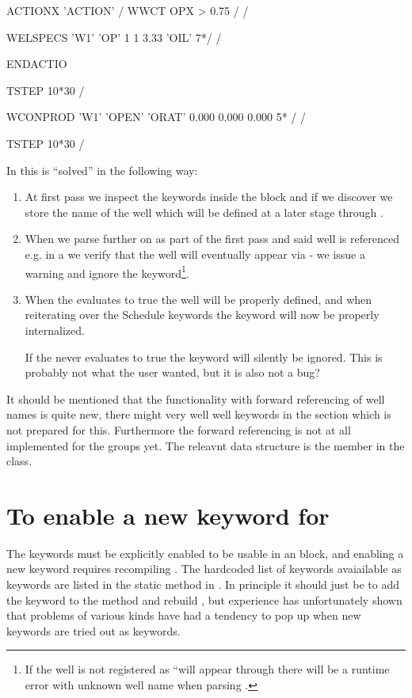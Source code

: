 \begin{deck}
ACTIONX
   'ACTION' /
   WWCT OPX  > 0.75 /
/

WELSPECS
  'W1'  'OP'  1 1 3.33  'OIL' 7*/
/

ENDACTIO

TSTEP
  10*30 /

WCONPROD
 'W1'      'OPEN'      'ORAT'      0.000      0.000      0.000  5* /
/

TSTEP
  10*30 /

\end{deck}

In \flow{} this is ``solved'' in the following way:
\begin{enumerate}
\item At first pass we inspect the keywords inside the \actionx{} block and if
  we discover  we store the name of the well which will be defined
  at a later stage through \actionx{}.
\item When we parse further on as part of the first pass and said well is
  referenced e.g. in a  we verify that the well will eventually
  appear via \actionx{} - we issue a warning and ignore the 
  keyword\footnote{If the well is not registered as ``will appear through
  \actionx{} there will be a runtime error with unknown well name when parsing
  .}.
\item When the \actionx{} evaluates to true the well will be properly defined,
  and when reiterating over the Schedule keywords the  keyword will
  now be properly internalized.

  If the \actionx{} never evaluates to true the  keyword will
  silently be ignored. This is probably not what the user wanted, but it is also
  not a bug?
\end{enumerate}
It should be mentioned that the functionality with forward referencing of well
names is quite new, there might very well well keywords in the 
section which is not prepared for this. Furthermore the forward referencing is
not at all implemented for the groups yet. The releavnt data structure is the
member  in the 
class.



\section{To enable a new keyword for \actionx}
The keywords must be explicitly enabled to be usable in an \actionx{} block, and
enabling a new keyword requires recompiling \flow{}. The hardcoded list of
keywords avaiailable as \actionx{} keywords are listed in the static method
 in
. In principle it should
just be to add the keyword to the  method
and rebuild \flow{}, but experience has unfortunately shown that problems of
various kinds have had a tendency to pop up when new keywords are tried out as
\actionx{} keywords.

